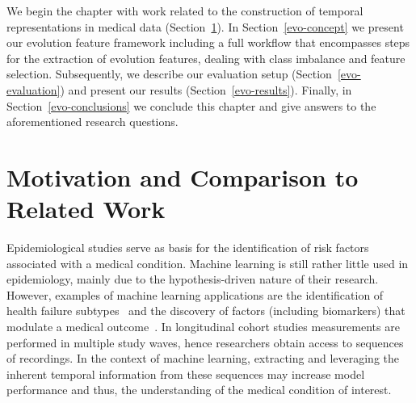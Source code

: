 \documentclass[
  oneside]{book}
\begin{document}
We begin the chapter with work related to the construction of temporal representations in medical data (Section~\ref{evo-intro}).
In Section~\ref{evo-concept} we present our evolution feature framework including a full workflow that encompasses steps for the extraction of evolution features, dealing with class imbalance and feature selection. Subsequently, we describe our evaluation setup (Section~\ref{evo-evaluation}) and present our results (Section~\ref{evo-results}).
Finally, in Section~\ref{evo-conclusions} we conclude this chapter and give answers to the aforementioned research questions.

\hypertarget{evo-intro}{%
\section{Motivation and Comparison to Related Work}\label{evo-intro}}

Epidemiological studies serve as basis for the identification of risk factors associated with a medical condition.
Machine learning is still rather little used in epidemiology, mainly due to the hypothesis-driven nature of their research.
However, examples of machine learning applications are the identification of health failure subtypes~\autocite{austin2013using} and the discovery of factors (including biomarkers) that modulate a medical outcome~\autocite{Raju2014,valavanis2013derivation}.
In longitudinal cohort studies measurements are performed in multiple study waves, hence researchers obtain access to sequences of recordings.
In the context of machine learning, extracting and leveraging the inherent temporal information from these sequences may increase model performance and thus, the understanding of the medical condition of interest.
\end{document}

